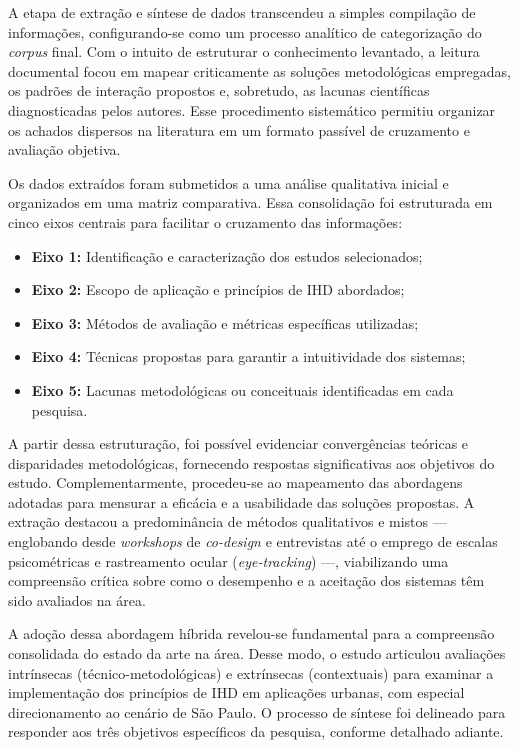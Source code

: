 \documentclass[
	12pt,				%
	oneside,			%
	a4paper,			%
	english,			%
	brazil				%
	]{abntex2ppgsi}
\begin{document}
    A etapa de extração e síntese de dados transcendeu a simples compilação de informações, configurando-se como um processo analítico de categorização do \textit{corpus} final. Com o intuito de estruturar o conhecimento levantado, a leitura documental focou em mapear criticamente as soluções metodológicas empregadas, os padrões de interação propostos e, sobretudo, as lacunas científicas diagnosticadas pelos autores. Esse procedimento sistemático permitiu organizar os achados dispersos na literatura em um formato passível de cruzamento e avaliação objetiva.

    Os dados extraídos foram submetidos a uma análise qualitativa inicial e organizados em uma matriz comparativa. Essa consolidação foi estruturada em cinco eixos centrais para facilitar o cruzamento das informações:

\begin{itemize}
    \item[] \textbf{Eixo 1:} Identificação e caracterização dos estudos selecionados;
    \item[] \textbf{Eixo 2:} Escopo de aplicação e princípios de IHD abordados;
    \item[] \textbf{Eixo 3:} Métodos de avaliação e métricas específicas utilizadas;
    \item[] \textbf{Eixo 4:} Técnicas propostas para garantir a intuitividade dos sistemas;
    \item[] \textbf{Eixo 5:} Lacunas metodológicas ou conceituais identificadas em cada pesquisa.
\end{itemize}

    A partir dessa estruturação, foi possível evidenciar convergências teóricas e disparidades metodológicas, fornecendo respostas significativas aos objetivos do estudo. Complementarmente, procedeu-se ao mapeamento das abordagens adotadas para mensurar a eficácia e a usabilidade das soluções propostas. A extração destacou a predominância de métodos qualitativos e mistos --- englobando desde \textit{workshops} de \textit{co-design} e entrevistas até o emprego de escalas psicométricas e rastreamento ocular (\textit{eye-tracking}) ---, viabilizando uma compreensão crítica sobre como o desempenho e a aceitação dos sistemas têm sido avaliados na área.

    A adoção dessa abordagem híbrida revelou-se fundamental para a compreensão consolidada do estado da arte na área. Desse modo, o estudo articulou avaliações intrínsecas (técnico-metodológicas) e extrínsecas (contextuais) para examinar a implementação dos princípios de IHD em aplicações urbanas, com especial direcionamento ao cenário de São Paulo. O processo de síntese foi delineado para responder aos três objetivos específicos da pesquisa, conforme detalhado adiante.
\end{document}
